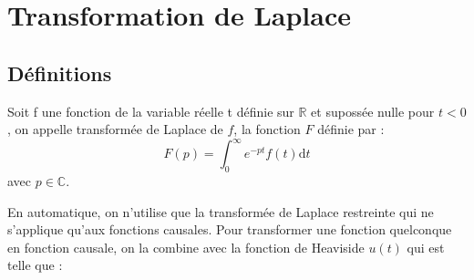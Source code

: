 \chapter{Transformation de Laplace\label{annexe-lap}}


\section{Définitions} 

Soit f une fonction de la variable réelle t définie sur $\mathbb{R}$ 
et supossée  nulle pour $t<0$, on appelle transformée de Laplace de $f$, la fonction $F$ définie par :
$$
F(p) = \int_0^\infty e^{-pt} f(t) \mathrm{d}t
$$
avec $p\in\mathbb{C}$. 

En automatique, on n'utilise que la transformée de Laplace restreinte qui 
ne s'applique qu'aux fonctions causales.
Pour transformer une fonction quelconque en fonction causale, 
on la combine avec la fonction de Heaviside $u(t)$ qui est telle que :



%
%

